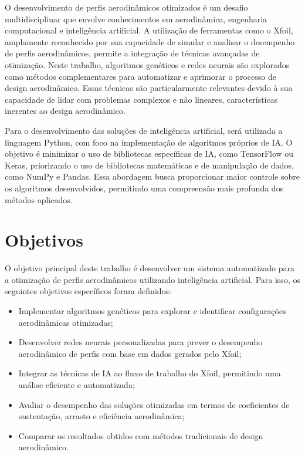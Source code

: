 O desenvolvimento de perfis aerodinâmicos otimizados é um desafio multidisciplinar que envolve conhecimentos em aerodinâmica, engenharia computacional e inteligência artificial. A utilização de ferramentas como o Xfoil, amplamente reconhecido por sua capacidade de simular e analisar o desempenho de perfis aerodinâmicos, permite a integração de técnicas avançadas de otimização. Neste trabalho, algoritmos genéticos e redes neurais são explorados como métodos complementares para automatizar e aprimorar o processo de design aerodinâmico. Essas técnicas são particularmente relevantes devido à sua capacidade de lidar com problemas complexos e não lineares, características inerentes ao design aerodinâmico. 

Para o desenvolvimento das soluções de inteligência artificial, será utilizada a linguagem Python, com foco na implementação de algoritmos próprios de IA. O objetivo é minimizar o uso de bibliotecas específicas de IA, como TensorFlow ou Keras, priorizando o uso de bibliotecas matemáticas e de manipulação de dados, como NumPy e Pandas. Essa abordagem busca proporcionar maior controle sobre os algoritmos desenvolvidos, permitindo uma compreensão mais profunda dos métodos aplicados.

\section{Objetivos}

O objetivo principal deste trabalho é desenvolver um sistema automatizado para a otimização de perfis aerodinâmicos utilizando inteligência artificial. Para isso, os seguintes objetivos específicos foram definidos:

\begin{itemize}
    \item Implementar algoritmos genéticos para explorar e identificar configurações aerodinâmicas otimizadas;
    \item Desenvolver redes neurais personalizadas para prever o desempenho aerodinâmico de perfis com base em dados gerados pelo Xfoil;
    \item Integrar as técnicas de IA ao fluxo de trabalho do Xfoil, permitindo uma análise eficiente e automatizada;
    \item Avaliar o desempenho das soluções otimizadas em termos de coeficientes de sustentação, arrasto e eficiência aerodinâmica;
    \item Comparar os resultados obtidos com métodos tradicionais de design aerodinâmico.
\end{itemize}

